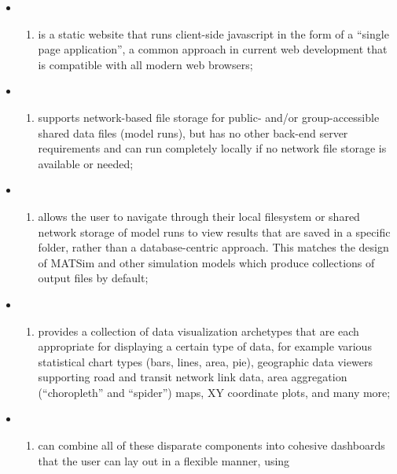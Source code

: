 \begin{itemize}
\item
  \begin{enumerate}
  \def\labelenumi{(\arabic{enumi})}
  \item
    is a static website that runs client-side javascript in the form of
    a ``single page application'', a common approach in current web
    development that is compatible with all modern web browsers;
  \end{enumerate}
\item
  \begin{enumerate}
  \def\labelenumi{(\arabic{enumi})}
  \setcounter{enumi}{1}
  \item
    supports network-based file storage for public- and/or
    group-accessible shared data files (model runs), but has no other
    back-end server requirements and can run completely locally if no
    network file storage is available or needed;
  \end{enumerate}
\item
  \begin{enumerate}
  \def\labelenumi{(\arabic{enumi})}
  \setcounter{enumi}{2}
  \item
    allows the user to navigate through their local filesystem or shared
    network storage of model runs to view results that are saved in a
    specific folder, rather than a database-centric approach. This
    matches the design of MATSim and other simulation models which
    produce collections of output files by default;
  \end{enumerate}
\item
  \begin{enumerate}
  \def\labelenumi{(\arabic{enumi})}
  \setcounter{enumi}{3}
  \item
    provides a collection of data visualization archetypes that are each
    appropriate for displaying a certain type of data, for example
    various statistical chart types (bars, lines, area, pie), geographic
    data viewers supporting road and transit network link data, area
    aggregation (``choropleth'' and ``spider'') maps, XY coordinate
    plots, and many more;
  \end{enumerate}
\item
  \begin{enumerate}
  \def\labelenumi{(\arabic{enumi})}
  \setcounter{enumi}{4}
  \item
    can combine all of these disparate components into cohesive
    dashboards that the user can lay out in a flexible manner, using

\end{enumerate}
\end{itemize}

